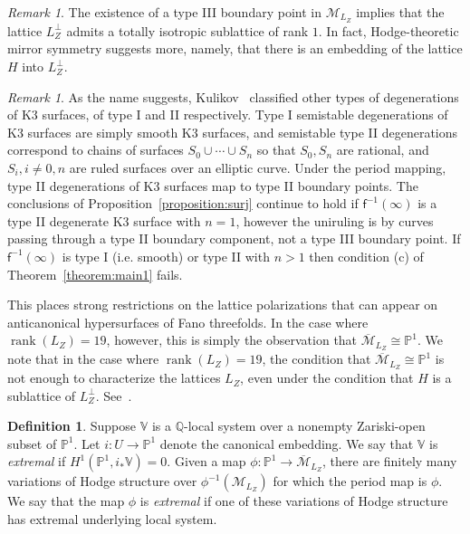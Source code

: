 \documentclass[10pt]{amsart}
\numberwithin{equation}{section}
\theoremstyle{plain}
\theoremstyle{definition}
\newtheorem{definition}[theorem]{Definition}
\theoremstyle{remark}
\newtheorem{remark}[theorem]{Remark}
\DeclareMathOperator{\rk}{rank}
\begin{document}
\begin{remark}
  The existence of a type III boundary point in \(\mathcal{M}_{L_Z}\) implies that the lattice \(L_Z^\perp\) admits a totally isotropic sublattice of rank \(1\). In fact, Hodge-theoretic mirror symmetry suggests more, namely, that there is an embedding of the lattice \(H\) into \(L_Z^\perp\).
\end{remark}

\begin{remark}
    As the name suggests, Kulikov~\cite{kulikov1977degenerations} classified other types of degenerations of K3 surfaces, of type I and II respectively. Type I semistable degenerations of K3 surfaces are simply smooth K3 surfaces, and semistable type II degenerations correspond to chains of surfaces \(S_0 \cup \cdots \cup S_n\) so that \(S_0, S_n\) are rational, and \(S_i, i \neq 0,n\) are ruled surfaces over an elliptic curve. Under the period mapping, type II degenerations of K3 surfaces map to type II boundary points. The conclusions of Proposition~\ref{proposition:surj} continue to hold if \(\mathsf{f}^{-1}(\infty)\) is a type II degenerate K3 surface with \(n=1\), however the uniruling is by curves passing through a type II boundary component, not a type III boundary point. If \(\mathsf{f}^{-1}(\infty)\) is type I (i.e. smooth) or type II with \(n > 1\) then condition (c) of Theorem~\ref{theorem:main1} fails.
\end{remark}

This places strong restrictions on the lattice polarizations that can appear on anticanonical hypersurfaces of Fano threefolds. In the case where \(\rk(L_Z) = 19\), however, this is simply the observation that \(\overline{\mathcal{M}}_{L_Z} \cong \mathbb{P}^1\). We note that in the case where \(\rk(L_Z) = 19\), the condition that \(\overline{\mathcal{M}}_{L_Z}  \cong \mathbb{P}^1\) is not enough to characterize the lattices \(L_Z\), even under the condition that \(H\) is a sublattice of \(L_Z^\perp\). See~\cite[Theorem 2.12]{doran2020calabi}.

\begin{definition}
  Suppose \(\mathbb{V}\) is a \(\mathbb{Q}\)-local system over a nonempty Zariski-open subset of \(\mathbb{P}^1\). Let \(i \colon U\rightarrow \mathbb{P}^1\) denote the canonical embedding. We say that \(\mathbb{V}\) is \emph{extremal} if \(H^1(\mathbb{P}^1,i_*\mathbb{V}) = 0\). Given a map \(\phi \colon \mathbb{P}^1 \rightarrow \overline{\mathcal{M}}_{L_Z}\), there are finitely many variations of Hodge structure over \(\phi^{-1}(\mathcal{M}_{L_Z})\) for which the period map is \(\phi\). We say that the map \(\phi\) is \emph{extremal} if one of these variations of Hodge structure has extremal underlying local system.
\end{definition}
\end{document}

